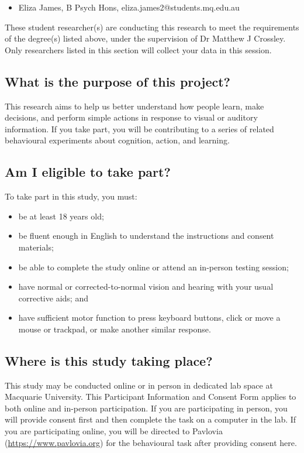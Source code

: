 \documentclass[letterpaper, 10pt]{article}
\let\oldsubsection\subsection
\renewcommand{\subsection}[1]{%
  \Needspace{10\baselineskip}%
  \oldsubsection{#1}%
}
\begin{document}
\begin{itemize}
\item Eliza James, B Psych Hons, eliza.james2@students.mq.edu.au
\end{itemize} 

These student researcher(s) are conducting this research to
meet the requirements of the degree(s) listed above, under
the supervision of Dr Matthew J Crossley. Only researchers
listed in this section will collect your data in this
session.

\subsection{What is the purpose of this project?}
This research aims to help us better understand how people
learn, make decisions, and perform simple actions in
response to visual or auditory information. If you take
part, you will be contributing to a series of related
behavioural experiments about cognition, action, and
learning.

\subsection{Am I eligible to take part?}
To take part in this study, you must:
\begin{itemize}
\item be at least 18 years old;

\item be fluent enough in English to understand the
    instructions and consent materials;

\item be able to complete the study online or attend an
    in-person testing session;

\item have normal or corrected-to-normal vision and hearing
    with your usual corrective aids; and

\item have sufficient motor function to press keyboard
    buttons, click or move a mouse or trackpad, or make
    another similar response.
\end{itemize}

\subsection{Where is this study taking place?}
This study may be conducted online or in person in dedicated
lab space at Macquarie University. This Participant
Information and Consent Form applies to both online and
in-person participation. If you are participating in person,
you will provide consent first and then complete the task on
a computer in the lab. If you are participating online, you
will be directed to Pavlovia
(\url{https://www.pavlovia.org}) for the behavioural task
after providing consent here.
\end{document}
